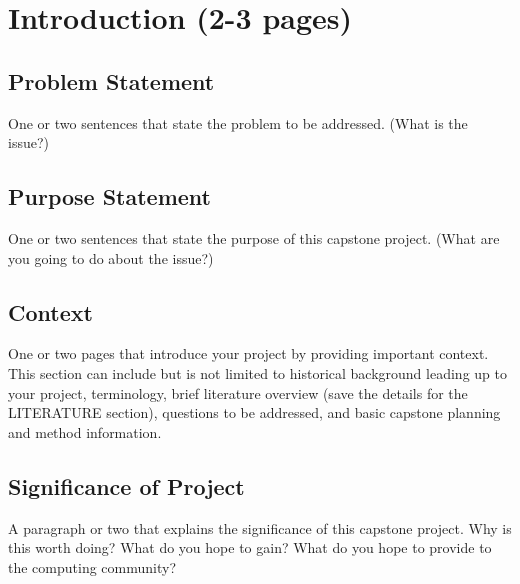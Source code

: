 \chapter{Introduction (2-3 pages)}


\section{Problem Statement} 

One or two sentences that state the problem to be addressed. (What is the issue?)




\section{Purpose Statement} 

One or two sentences that state the purpose of this capstone project. (What are you going to do about the issue?) 




\section{Context} 

One or two pages that introduce your project by providing important context. This section can include but is not limited to historical background leading up to your project, terminology, brief literature overview (save the details for the LITERATURE section), questions to be addressed, and basic capstone planning and method information. 




\section{Significance of Project} 

A paragraph or two that explains the significance of this capstone project. Why is this worth doing? What do you hope to gain? What do you hope to provide to the computing community?

